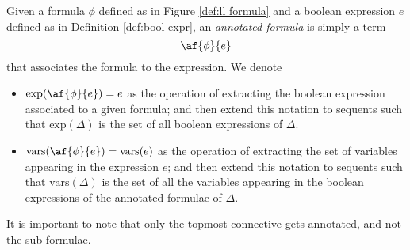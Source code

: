 \begin{define}
	\label{def:annotated}
	Given a formula $\phi$ defined as in Figure \ref{def:ll formula} and a boolean expression $e$ defined as in Definition \ref{def:bool-expr}, an \textit{annotated formula} is simply a term 
	$$ \af{\phi}{e} $$
	that associates the formula to the expression.
	We denote 
	\begin{itemize}
		\item $ \mathrm{exp}(\af{\phi}{e}) = e $
			as the operation of extracting the boolean expression associated to a given formula; and then extend this notation to sequents such that $ \mathrm{exp}(\Delta) $ is the set of all boolean expressions of $\Delta$.
		\item $\mathrm{vars}(\af{\phi}{e}) = \mathrm{vars}(e) $
			as the operation of extracting the set of variables appearing in the expression $e$; and then extend this notation to sequents such that $ \mathrm{vars}(\Delta)$ is the set of all the variables appearing in the boolean expressions of the annotated formulae of $\Delta$.
	\end{itemize}
\end{define}
It is important to note that only the topmost connective gets annotated, and not the sub-formulae.

